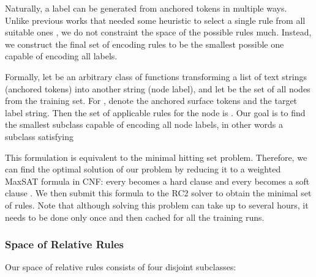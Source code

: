\documentclass[11pt,a4paper]{article}
\begin{document}
Naturally, a label can be generated from anchored tokens in multiple ways. Unlike previous works that needed some heuristic to select a single rule from all suitable ones \citep{Str:Str:19}, we do not constraint the space of the possible rules much. Instead, we construct the final set of encoding rules to be the smallest possible one capable of encoding all labels.

Formally, let  be an arbitrary class of functions transforming a list of text strings (anchored tokens) into another string (node label), and let  be the set of all nodes from the training set. For \hbox{}, denote  the anchored surface tokens and  the target label string. Then the set of applicable rules for the node  is . Our goal is to find the smallest subclass  capable of encoding all node labels, in other words a subclass  satisfying

This formulation is equivalent to the minimal hitting set problem. Therefore, we can find the optimal solution of our problem by reducing it to a weighted MaxSAT formula in CNF: every  becomes a hard clause  and every  becomes a soft clause . 
We then submit this formula to the RC2 solver \cite{ignatiev2019rc2} to obtain the minimal set of rules. Note that although solving this problem can take up to several hours, it needs to be done only once and then cached for all the training runs.

\subsubsection{Space of Relative Rules}

Our space of relative rules  consists of four disjoint subclasses:
\end{document}
